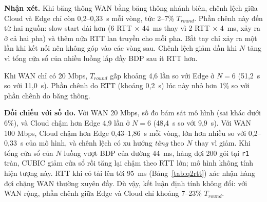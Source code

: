 \begin{table}[H]
    \centering
    \caption{$T_{round}$ theo vị trí Aggregator (giây), giá trị mô hình và số đo}
    \label{tab:q3}
\end{table}

\textbf{Nhận xét.} Khi băng thông WAN bằng băng thông nhánh biên, chênh lệch giữa Cloud và Edge chỉ còn 0{,}2--0{,}33~s mỗi vòng, tức 2--7\% $T_{round}$. Phần chênh này đến từ hai nguồn: slow start dài hơn (6 RTT $\times$ 44~ms thay vì 2 RTT $\times$ 4~ms, xảy ra ở cả hai pha) và thêm nửa RTT lan truyền cho mỗi pha. Bắt tay chỉ xảy ra một lần khi kết nối nên không góp vào các vòng sau. Chênh lệch giảm dần khi $N$ tăng vì tổng cửa sổ của nhiều luồng lấp đầy BDP sau ít RTT hơn.

Khi WAN chỉ có 20 Mbps, $T_{round}$ gấp khoảng 4{,}6 lần so với Edge ở $N = 6$ (51{,}2~s so với 11{,}0~s). Phần chênh do RTT (khoảng 0{,}2~s) lúc này nhỏ hơn 1\% so với phần chênh do băng thông.

\textbf{Đối chiếu với số đo.} Với WAN 20 Mbps, số đo bám sát mô hình (sai khác dưới 6\%), và Cloud chậm hơn Edge 4{,}9 lần ở $N = 6$ (48{,}4~s so với 9{,}9~s). Với WAN 100 Mbps, Cloud chậm hơn Edge 0{,}43--1{,}86~s mỗi vòng, lớn hơn nhiều so với 0{,}2--0{,}33~s của mô hình, và chênh lệch có xu hướng \emph{tăng} theo $N$ thay vì giảm. Khi tổng cửa sổ của $N$ luồng vượt BDP của đường 44~ms, hàng đợi 200 gói tại \texttt{r1} tràn, CUBIC giảm cửa sổ rồi tăng lại chậm theo RTT lớn; mô hình không tính hiện tượng này. RTT khi có tải lên tới 95~ms (Bảng~\ref{tab:q2rtt}) xác nhận hàng đợi chặng WAN thường xuyên đầy. Dù vậy, kết luận định tính không đổi: với WAN rộng, phần chênh giữa Edge và Cloud chỉ khoảng 7--23\% $T_{round}$.

